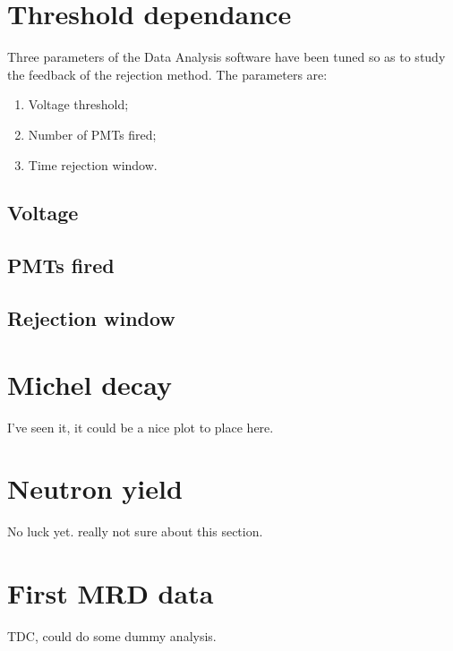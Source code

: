 \section{Threshold dependance}

Three parameters of the Data Analysis software have been tuned so as to study the feedback %
of the rejection method.
The parameters are:
\begin{enumerate}
  \item Voltage threshold;
  \item Number of PMTs fired;
  \item Time rejection window.
\end{enumerate}

\subsection{Voltage}
\subsection{PMTs fired}
\subsection{Rejection window}

\section{Michel decay}
I've seen it, it could be a nice plot to place here. 

\section{Neutron yield}
No luck yet.
really not sure about this section.

\section{First MRD data}
TDC, could do some dummy analysis.
